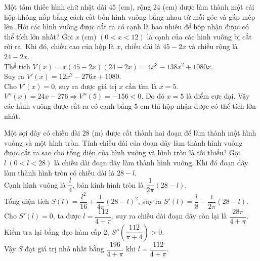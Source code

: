 \begin{bt}%
	Một tấm thiếc hình chữ nhật dài $45$ (cm), rộng $24$ (cm) được làm thành một cái hộp không nắp bằng cách cắt bốn hình vuông bằng nhau từ mỗi góc và gấp mép lên. Hỏi các hình vuông được cắt ra có cạnh là bao nhiêu để hộp nhận được có thể tích lớn nhất?
	\loigiai 
	{
		Gọi $x$ (cm) $\left(0<x<12\right)$ là cạnh của các hình vuông bị cắt rời ra. Khi đó, chiều cao của hộp là $x$, chiều dài là $45-2x$ và chiều rộng là $24-2x$. \\
		Thể tích $V(x) = x \left(45-2x\right) \left(24-2x\right) = 4x^3-138x^2+1080x$. \\
		Suy ra $V'(x)=12x^2-276x+1080$. \\
		Cho $V'(x) = 0$, suy ra được giá trị $x$ cần tìm là $x=5$. \\
		$V''(x) = 24x-276 \Rightarrow V''(5) = -156<0$. Do đó $x=5$ là điểm cực đại. Vậy các hình vuông được cắt ra có cạnh bằng $5$ cm thì hộp nhận được có thể tích lớn nhất.
	}
\end{bt}

\begin{bt}%
	Một sợi dây có chiều dài $28$ (m) được cắt thành hai đoạn để làm thành một hình vuông và một hình tròn. Tính chiều dài của đoạn dây làm thành hình vuông được cắt ra sao cho tổng diện của hình vuông và hình tròn là tối thiểu?
	\loigiai 
	{
		Gọi $l~\left(0<l<28\right)$ là chiều dài đoạn dây làm thành hình vuông. Khi đó đoạn dây làm thành hình tròn có chiều dài là $28-l$. \\
		Cạnh hình vuông là $\dfrac{l}{4}$, bán kính hình tròn là $\dfrac{1}{2 \pi} \left(28-l\right)$. \\
		Tổng diện tích $S(l)=\dfrac{l^2}{16}+\dfrac{1}{4\pi}{\left(28-l\right)}^2$, suy ra $S'(l)=\dfrac{l}{8}-\dfrac{1}{2 \pi} \left(28-l\right)$. \\
		Cho $S'(l)=0$, ta được $l=\dfrac{112}{4+\pi}$, suy ra chiều dài đoạn dây còn lại là $\dfrac{28\pi}{4+\pi}$. \\
		Kiểm tra lại bằng đạo hàm cấp $2$, $S''\left(\dfrac{112}{\pi+4}\right)>0$. \\
		Vậy $S$ đạt giá trị nhỏ nhất bằng $\dfrac{196}{4+\pi}$ khi $l=\dfrac{112}{4+\pi}$.
	}
\end{bt}

